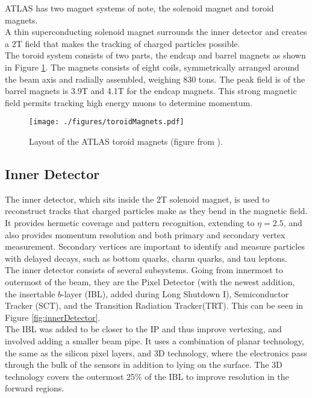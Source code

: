 ATLAS has two magnet systems of note, the solenoid magnet and toroid magnets.\\

A thin superconducting solenoid magnet surrounds the inner detector and creates a 2T field that makes the tracking of charged particles possible.  \\

The toroid system consists of two parts, the endcap and barrel magnets as shown in Figure \ref{fig:atlasToroids}.  The magnets consists of eight coils, symmetrically arranged around the beam axis and radially assembled, weighing 830 tons.  The peak field is of the barrel magnets is 3.9T and 4.1T for the endcap magnets.  This strong magnetic field permits tracking high energy muons to determine momentum.\\

\begin{figure}[h!]
  \centering
	\texttt{[image: ./figures/toroidMagnets.pdf]}
\caption[Layout of the ATLAS toroid magnets]{\label{fig:atlasToroids}{ Layout of the ATLAS toroid magnets (figure from \cite{DetectorPaper:2008}). }} %
\end{figure}

\subsection{Inner Detector}

The inner detector, which sits inside the 2T solenoid magnet, is used to reconstruct tracks that charged particles make as they bend in the magnetic field.  It provides hermetic coverage and pattern recognition, extending to $\eta=2.5$, and also provides momentum resolution and both primary and secondary vertex measurement.  Secondary vertices are important to identify and measure particles with delayed decays, such as bottom quarks, charm quarks, and tau leptons.  \\

The inner detector consists of several subsystems.  Going from innermost to outermost of the beam, they are the Pixel Detector (with the newest addition, the insertable $b$-layer (IBL), added during Long Shutdown I), Semiconductor Tracker (SCT), and the Transition Radiation Tracker(TRT).  This can be seen in Figure \ref{fig:innerDetector}.\\

The IBL was added to be closer to the IP and thus improve vertexing, and involved adding a smaller beam pipe.  It uses a combination of planar technology, the same as the silicon pixel layers, and 3D technology, where the electronics pass through the bulk of the sensors in addition to lying on the surface.  The 3D technology covers the outermost 25\% of the IBL to improve resolution in the forward regions. \\ %

